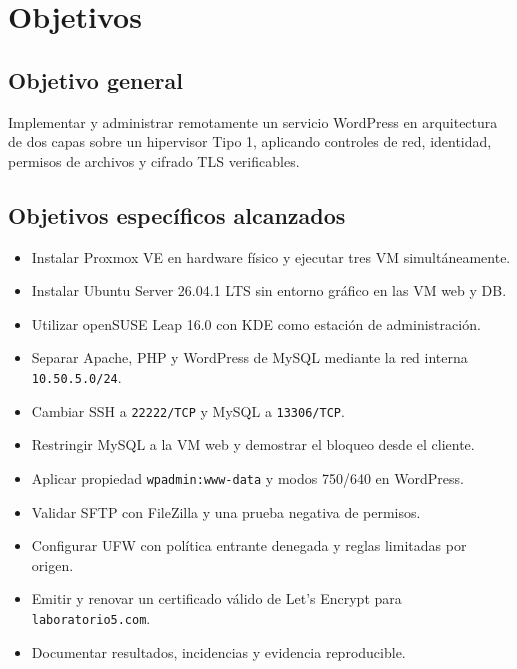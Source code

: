 \section{Objetivos}

\subsection{Objetivo general}

Implementar y administrar remotamente un servicio WordPress en arquitectura de dos capas sobre un hipervisor Tipo 1, aplicando controles de red, identidad, permisos de archivos y cifrado TLS verificables.

\subsection{Objetivos específicos alcanzados}

\begin{itemize}
  \item Instalar Proxmox VE en hardware físico y ejecutar tres VM simultáneamente.
  \item Instalar Ubuntu Server 26.04.1 LTS sin entorno gráfico en las VM web y DB.
  \item Utilizar openSUSE Leap 16.0 con KDE como estación de administración.
  \item Separar Apache, PHP y WordPress de MySQL mediante la red interna \texttt{10.50.5.0/24}.
  \item Cambiar SSH a \texttt{22222/TCP} y MySQL a \texttt{13306/TCP}.
  \item Restringir MySQL a la VM web y demostrar el bloqueo desde el cliente.
  \item Aplicar propiedad \texttt{wpadmin:www-data} y modos 750/640 en WordPress.
  \item Validar SFTP con FileZilla y una prueba negativa de permisos.
  \item Configurar UFW con política entrante denegada y reglas limitadas por origen.
  \item Emitir y renovar un certificado válido de Let's Encrypt para \texttt{laboratorio5.com}.
  \item Documentar resultados, incidencias y evidencia reproducible.
\end{itemize}
